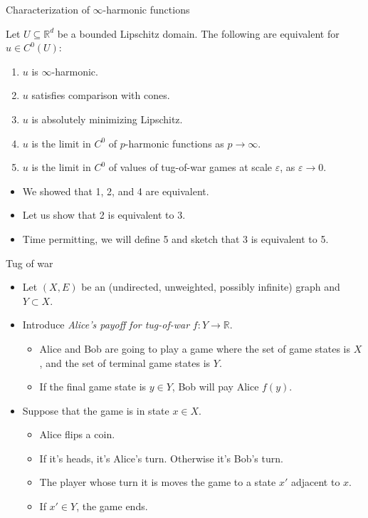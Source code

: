 \documentclass[10pt]{beamer}
\newcommand{\RR}{\mathbb{R}}
\begin{document}
\begin{frame}{Characterization of $\infty$-harmonic functions}
\begin{theorem}
Let $U \subseteq \RR^d$ be a bounded Lipschitz domain.
The following are equivalent for $u \in C^0(U)$: 
\begin{enumerate}
\item $u$ is $\infty$-harmonic. 
\item $u$ satisfies comparison with cones. 
\item $u$ is absolutely minimizing Lipschitz. 
\item $u$ is the limit in $C^0$ of $p$-harmonic functions as $p \to \infty$. 
\item $u$ is the limit in $C^0$ of values of tug-of-war games at scale $\varepsilon$, as $\varepsilon \to 0$. 
\end{enumerate}
\end{theorem}
    
\begin{itemize}
    \item We showed that 1, 2, and 4 are equivalent. 
    \item Let us show that 2 is equivalent to 3. 
    \item Time permitting, we will define 5 and sketch that 3 is equivalent to 5.
\end{itemize}
\end{frame}

\begin{frame}{Tug of war}
\begin{itemize}
\item Let $(X, E)$ be an (undirected, unweighted, possibly infinite) graph and $Y \subset X$. 
\item Introduce \emph{Alice's payoff for tug-of-war} $f: Y \to \RR$.  
\begin{itemize}
\item Alice and Bob are going to play a game where the set of game states is $X$, and the set of terminal game states is $Y$.
\item If the final game state is $y \in Y$, Bob will pay Alice $f(y)$.  
\end{itemize}
\item Suppose that the game is in state $x \in X$.  
\begin{itemize}
\item Alice flips a coin.
\item If it's heads, it's Alice's turn. Otherwise it's Bob's turn.
\item The player whose turn it is moves the game to a state $x'$ adjacent to $x$.
\item If $x' \in Y$, the game ends.
\end{itemize}
\end{itemize}
\end{frame}
\end{document}
